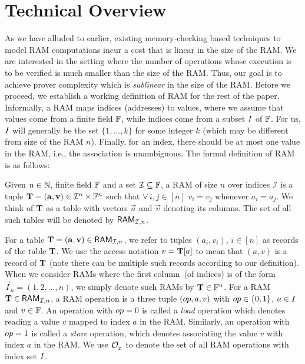 \section{Technical Overview}\label{sec:tech-overview}
As we have alluded to earlier, existing memory-checking based techniques to model RAM computations incur a cost
that is linear in the size of the RAM. We are interested in the setting where the number of operations whose
execution is to be verified is much smaller than the size of the RAM. Thus, our goal is to achieve prover complexity
which is {\em sublinear} in the size of the RAM. Before we proceed, we establish a
working definition of RAM for the rest of the paper. Informally, a RAM maps indices (addresses) to values, where
we assume that values come from a finite field $\mathbb{F}$, while indices come from a subset $I$ of $\mathbb{F}$. For us,
$I$ will generally be the set $\{1,\ldots,k\}$ for some integer $k$ (which may be different from size of
the RAM $n$). Finally, for an index, there should be at most one value in the RAM, i.e., the association is unambiguous.
The formal definition of RAM is as follows:
\begin{definition}[RAM]\label{defn:RAM}
Given $n\in \mathbb{N}$, finite field $\mathbb{F}$ and a set $\mathcal{I}\subseteq \mathbb{F}$, a RAM of size $n$ over indices $\mathcal{I}$
is a tuple $\mathbf{T}=(\mathbf{a},\mathbf{v})\in \mathcal{I}^n\times \mathbb{F}^n$ such that $\forall\, i,j\in [n]$  $v_i=v_j$ whenever $a_i=a_j$.
We think of $\mathbf{T}$ as a table with vectors $\vec{a}$ and $\vec{v}$ denoting its columns. The set of all such
tables will be denoted by $\mathsf{RAM}_{\mathcal{I}, {n}}$.
\end{definition}
For a table $\mathbf{T}=(\mathbf{a},\mathbf{v})\in \mathsf{RAM}_{\mathcal{I}, {n}}$, we refer to tuples $(a_i,v_i)$, $i\in [n]$ as records of the table $\mathbf{T}$.
We use the access notation $v=\mathbf{T}[a]$ to mean that $(a,v)$ is a record of $\mathbf{T}$ (note there can be multiple such records
according to our definition). When we consider RAMs where the first column~(of indices) is of the form $\vec{I}_n=(1,2,\ldots,n)$, we simply 
denote such RAMs by $\mathbf{T}\in\mathbb{F}^n$.
For a RAM $\mathbf{T}\in \mathsf{RAM}_{\mathcal{I}, {n}}$, a RAM operation is a three tuple $({op},a,v)$ with ${op}\in \{0,1\}$,
$a\in I$ and $v\in \mathbb{F}$. An operation with ${op}=0$ is called a {\em load} operation which denotes reading a value $v$
mapped to index $a$ in the RAM. Similarly, an operation with ${op}=1$ is called a {\em store} operation,
which denotes associating the value $v$ with index $a$ in the RAM.
We use $\mathcal{O}_{{}_\mathcal{I}}$ to denote the set of all RAM operations with index set $I$.

